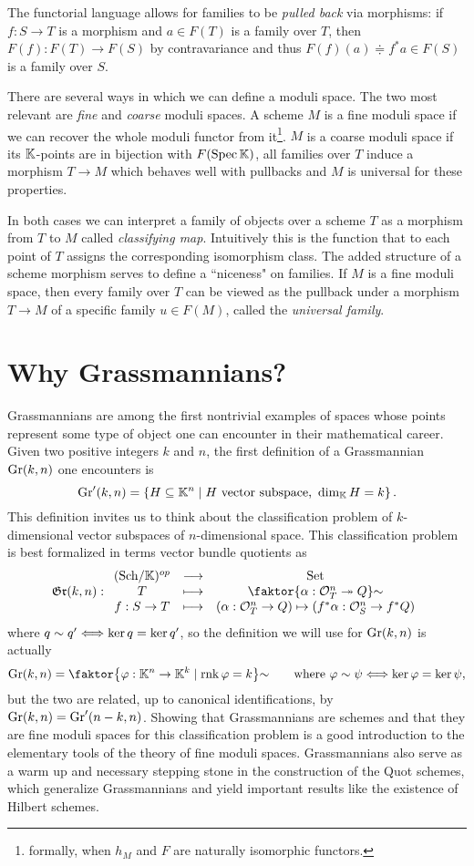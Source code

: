 The functorial language allows for families to be \textit{pulled back} via morphisms: if $f:S\to T$ is a morphism and $a\in F(T)$ is a family over $T$, then $F(f):F(T)\to F(S)$ by contravariance and thus $F(f)(a)\doteqdot f^\ast a\in F(S)$ is a family over $S$.
\medskip

There are several ways in which we can define a moduli space. The two most relevant are \textit{fine} and \textit{coarse} moduli spaces. A scheme $M$ is a fine moduli space if we can recover the whole moduli functor from it\footnote{formally, when $h_M$ and $F$ are naturally isomorphic functors.}. $M$ is a coarse moduli space if its $\mathbb{K}$-points are in bijection with $F(\mathrm{Spec}\, \mathbb{K})$, all families over $T$ induce a morphism $T\to M$ which behaves well with pullbacks and $M$ is universal for these properties.

In both cases we can interpret a family of objects over a scheme $T$ as a morphism from $T$ to $M$ called \textit{classifying map}.  Intuitively this is the function that to each point of $T$ assigns the corresponding isomorphism class. The added structure of a scheme morphism serves to define a ``niceness" on families. If $M$ is a fine moduli space, then every family over $T$ can be viewed as the pullback under a morphism $T\to M$ of a specific family $u\in F(M)$, called the \textit{universal family}.

\section*{Why Grassmannians?}
Grassmannians are among the first nontrivial examples of spaces whose points represent some type of object one can encounter in their mathematical career. Given two positive integers $k$ and $n$, the first definition of a Grassmannian $\mathrm{Gr}(k,n)$ one encounters is
\[\mathrm{Gr}'(k,n)=\left\{{H\subseteq\mathbb{K}^n\mid \text{$H$ vector subspace, }\dim_{\mathbb{K}} H=k}\right\}.\]
This definition invites us to think about the classification problem of $k$-\!\! dimensional vector subspaces of $n$-dimensional space. This classification problem is best formalized in terms vector bundle quotients as
\[\gr(k,n):\functorDef{(\Sch\K)\op}{\Set}{T}{\quot{\cpa{\al:\Oc_T^n\onto Q}}\sim}{f:S\to T}{(\al:\Oc_T^n\to Q)\mapsto (f^\ast\al:\Oc_S^n\to f^\ast Q)}\]
where $q\sim q'\Longleftrightarrow \ker q=\ker q'$, so the definition we will use for $\mathrm{Gr}(k,n)$ is actually
\[\Gr(k,n)=\quot{\cpa{\vp:\K^n\to \K^k\mid \rnk \vp=k}}\sim\qquad \text{where }\vp\sim \psi\coimplies \ker\vp=\ker\psi,\]
but the two are related, up to canonical identifications, by $\mathrm{Gr}(k,n)=\mathrm{Gr}'(n-k,n)$.
Showing that Grassmannians are schemes and that they are fine moduli spaces for this classification problem is a good introduction to the elementary tools of the theory of fine moduli spaces. Grassmannians also serve as a warm up and necessary stepping stone in the construction of the Quot schemes, which generalize Grassmannians and yield important results like the existence of Hilbert schemes.


